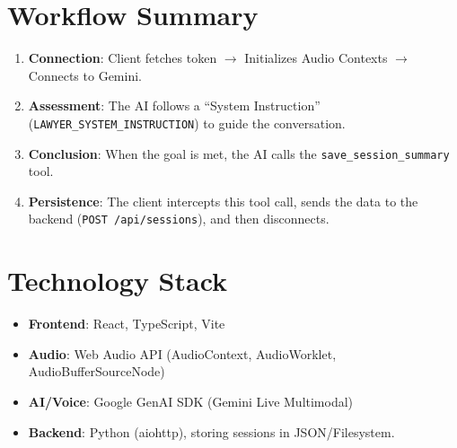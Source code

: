 \documentclass{article}
\begin{document}
\section{Workflow Summary}
\begin{enumerate}
    \item \textbf{Connection}: Client fetches token $\rightarrow$ Initializes Audio Contexts $\rightarrow$ Connects to Gemini.
    \item \textbf{Assessment}: The AI follows a ``System Instruction'' (\texttt{LAWYER\_SYSTEM\_INSTRUCTION}) to guide the conversation.
    \item \textbf{Conclusion}: When the goal is met, the AI calls the \texttt{save\_session\_summary} tool.
    \item \textbf{Persistence}: The client intercepts this tool call, sends the data to the backend (\texttt{POST /api/sessions}), and then disconnects.
\end{enumerate}

\section{Technology Stack}
\begin{itemize}
    \item \textbf{Frontend}: React, TypeScript, Vite
    \item \textbf{Audio}: Web Audio API (AudioContext, AudioWorklet, AudioBufferSourceNode)
    \item \textbf{AI/Voice}: Google GenAI SDK (Gemini Live Multimodal)
    \item \textbf{Backend}: Python (aiohttp), storing sessions in JSON/Filesystem.
\end{itemize}
\end{document}
